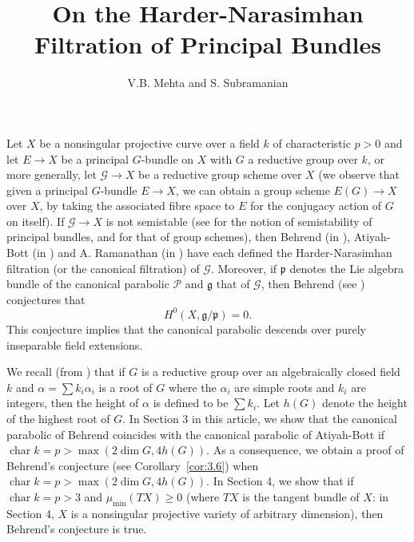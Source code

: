 \documentclass[12pt]{article}
\begin{document}
\title{On the Harder-Narasimhan Filtration of Principal Bundles}
\author{V.B. Mehta and S. Subramanian}
\date{}
\maketitle

\section{}

Let $X$ be a nonsingular projective curve over a field $k$ of characteristic $p > 0$ and let $E \to X$ be a principal $G$-bundle on $X$ with $G$ a reductive group over $k$, or more generally, let $\mathcal{G} \to X$ be a reductive group scheme over $X$ (we observe that given a principal $G$-bundle $E \to X$, we can obtain a group scheme $E(G) \to X$ over $X$, by taking the associated fibre space to $E$ for the conjugacy action of $G$ on itself). If $\mathcal{G} \to X$ is not semistable (see \cite{ramanathan-moduli} for the notion of semistability of principal bundles, and \cite{behrend} for that of group schemes), then Behrend (in \cite{behrend}), Atiyah-Bott (in \cite{atiyah-bott}) and A. Ramanathan (in \cite{ramanathan-moduli}) have each defined the Harder-Narasimhan filtration (or the canonical filtration) of $\mathcal{G}$. Moreover, if $\mathfrak{p}$ denotes the Lie algebra bundle of the canonical parabolic $\mathcal{P}$ and $\mathfrak{g}$ that of $\mathcal{G}$, then Behrend (see \cite[Conjecture 7.6]{behrend}) conjectures that
\[
H^0(X, \mathfrak{g}/\mathfrak{p}) = 0.
\]
This conjecture implies that the canonical parabolic descends over purely inseparable field extensions.

We recall (from \cite{imp}) that if $G$ is a reductive group over an algebraically closed field $k$ and $\alpha = \sum k_i \alpha_i$ is a root of $G$ where the $\alpha_i$ are simple roots and $k_i$ are integers, then the height of $\alpha$ is defined to be $\sum k_i$. Let $h(G)$ denote the height of the highest root of $G$. In Section 3 in this article, we show that the canonical parabolic of Behrend coincides with the canonical parabolic of Atiyah-Bott if $\operatorname{char} k = p > \max(2 \dim G, 4h(G))$. As a consequence, we obtain a proof of Behrend's conjecture (see Corollary~\ref{cor:3.6}) when $\operatorname{char} k = p > \max(2 \dim G, 4h(G))$. In Section 4, we show that if $\operatorname{char} k = p > 3$ and $\mu_{\min}(TX) \geq 0$ (where $TX$ is the tangent bundle of $X$: in Section 4, $X$ is a nonsingular projective variety of arbitrary dimension), then Behrend's conjecture is true.
\end{document}
